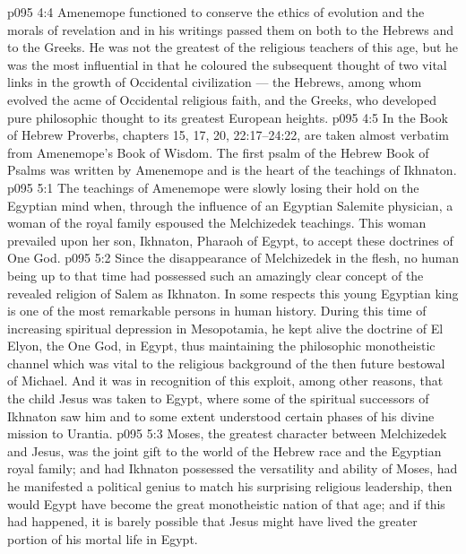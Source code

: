 \vs p095 4:4 Amenemope functioned to conserve the ethics of evolution and the morals of revelation and in his writings passed them on both to the Hebrews and to the Greeks. He was not the greatest of the religious teachers of this age, but he was the most influential in that he coloured the subsequent thought of two vital links in the growth of Occidental civilization --- the Hebrews, among whom evolved the acme of Occidental religious faith, and the Greeks, who developed pure philosophic thought to its greatest European heights.
\vs p095 4:5 \pc In the Book of Hebrew Proverbs, chapters 15, 17, 20, 22:17--24:22, are taken almost verbatim from Amenemope’s Book of Wisdom. The first psalm of the Hebrew Book of Psalms was written by Amenemope and is the heart of the teachings of Ikhnaton.
\vs p095 5:1 The teachings of Amenemope were slowly losing their hold on the Egyptian mind when, through the influence of an Egyptian Salemite physician, a woman of the royal family espoused the Melchizedek teachings. This woman prevailed upon her son, Ikhnaton, Pharaoh of Egypt, to accept these doctrines of One God.
\vs p095 5:2 Since the disappearance of Melchizedek in the flesh, no human being up to that time had possessed such an amazingly clear concept of the revealed religion of Salem as Ikhnaton. In some respects this young Egyptian king is one of the most remarkable persons in human history. During this time of increasing spiritual depression in Mesopotamia, he kept alive the doctrine of El Elyon, the One God, in Egypt, thus maintaining the philosophic monotheistic channel which was vital to the religious background of the then future bestowal of Michael. And it was in recognition of this exploit, among other reasons, that the child Jesus was taken to Egypt, where some of the spiritual successors of Ikhnaton saw him and to some extent understood certain phases of his divine mission to Urantia.
\vs p095 5:3 Moses, the greatest character between Melchizedek and Jesus, was the joint gift to the world of the Hebrew race and the Egyptian royal family; and had Ikhnaton possessed the versatility and ability of Moses, had he manifested a political genius to match his surprising religious leadership, then would Egypt have become the great monotheistic nation of that age; and if this had happened, it is barely possible that Jesus might have lived the greater portion of his mortal life in Egypt.
